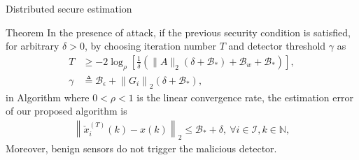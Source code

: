 \documentclass[10pt]{beamer}
\newcommand{\Bc}{{\mathcal B}}
\newcommand{\Ica}{{\mathcal I}}
\newcommand{\Nb}{{\mathbb N}}
\newcommand{\cx}{{\check{x}}}
\begin{document}
\begin{frame}{Distributed secure estimation}

	\begin{block}{Theorem}
	In the presence of attack, if the previous security condition is satisfied, for arbitrary $\delta>0$, by choosing iteration number $T$ and detector threshold $\gamma$ as 
	\begin{align}
		T&\geq -2\log_{\rho}\left[ \frac{1}{\delta} \left( \|A\|_2(\delta+\Bc_{*})+\Bc_{w}+ \Bc_{*} \right)\right], \label{eq:chooseT}\\
		\gamma&\triangleq\Bc_\epsilon + \left\|G_i\right\|_2 (\delta+\Bc_{*}), \label{eq:choose_gamma}
	\end{align}
	in Algorithm where $0<\rho<1$ is the linear convergence rate, the estimation error of our proposed algorithm is
	\begin{align*}
		\left\|\cx_i^{(T)}(k)-x(k)\right\|_2 \leq \Bc_{*}+\delta, \ \forall i\in\Ica, k\in\Nb,
	\end{align*}
	Moreover, benign sensors do not trigger the malicious detector.
	
	\end{block}


	
\end{frame}
\end{document}
